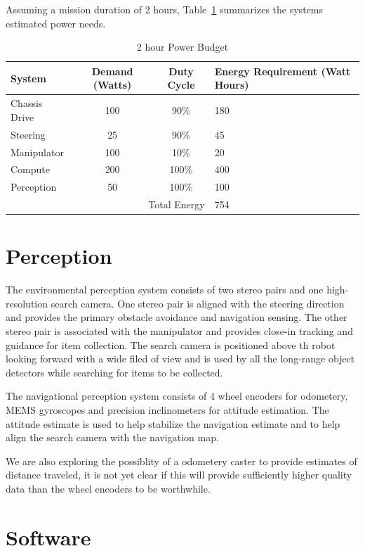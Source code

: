 \documentclass[12pt]{article}
\begin{document}
Assuming a mission duration of 2 hours, Table~\ref{power budget} summarizes the systems estimated power needs.

\begin{table}[htbp]
    \begin{tabular}{|l|c|c||p{4cm}|}
        \hline
        System & Demand (Watts) & Duty Cycle & Energy Requirement (Watt Hours)\\
        \hline
        Chassis Drive & 100 & 90\% & 180\\
        Steering & 25 & 90\% & 45\\
        Manipulator & 100 & 10\% & 20\\
        Compute & 200 & 100\% & 400\\
        Perception & 50 & 100\% & 100\\
        \hline
        \multicolumn{3}{|r||}{Total Energy} & 754\\
        \hline
    \end{tabular}
    \caption{2 hour Power Budget}
    \label{power budget}
\end{table}

\section{Perception}\label{Perception}
The environmental perception system consists of two stereo pairs and one high-resolution search camera. One stereo pair is aligned with the steering direction and provides the primary obstacle avoidance and navigation sensing. The other stereo pair is associated with the manipulator and provides close-in tracking and guidance for item collection. The search camera is positioned above th robot looking forward with a wide filed of view and is used by all the long-range object detectors while searching for items to be collected.

The navigational perception system consists of 4 wheel encoders for odometery, MEMS gyroscopes and precision inclinometers for attitude estimation. The attitude estimate is used to help stabilize the navigation estimate and to help align the search camera with the navigation map.

We are also exploring the possiblity of a odometery caster to provide estimates of distance traveled, it is not yet clear if this will provide sufficiently higher quality data than the wheel encoders to be worthwhile.

\section{Software}\label{Software}
\end{document}
